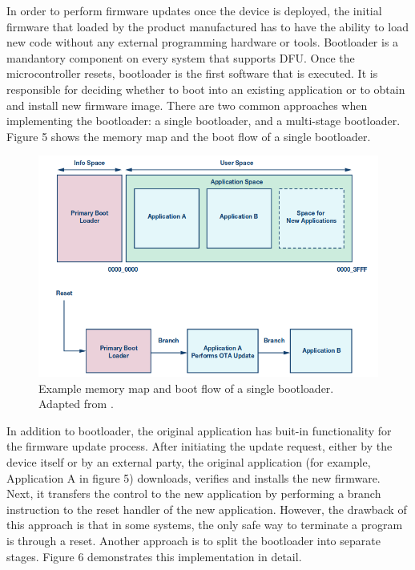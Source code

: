 \justify
In order to perform firmware updates once the device is deployed, the initial
firmware that loaded by the product manufactured has to have the ability to 
load new code without any external programming hardware or tools. Bootloader is 
a mandantory component on every system that supports DFU. Once the microcontroller
resets, bootloader is the first software that is executed. It is responsible for
deciding whether to boot into an existing application or to obtain and install new
firmware image. There are two common approaches when implementing the bootloader:
a single bootloader, and a multi-stage bootloader. Figure 5 shows the memory map 
and the boot flow of a single bootloader. 
\begin{figure}[H]
    \centering
    \includegraphics[scale=0.5]{figure/figure05_bl.png}
    \caption{Example memory map and boot flow of a single bootloader.
    Adapted from \cite{ben18}.}
\end{figure}  
\justify
In addition to bootloader, the original application has buit-in functionality for 
the firmware update process. After initiating the update request, either by the 
device itself or by an external party, the original application (for example, 
Application A in figure 5) downloads, verifies and installs the new firmware.
Next, it transfers the control to the new application by performing a branch 
instruction to the reset handler of the new application. However, the drawback 
of this approach is that in some systems, the only safe way to terminate a program 
is through a reset. Another approach is to split the bootloader into separate stages.
Figure 6 demonstrates this implementation in detail.   
